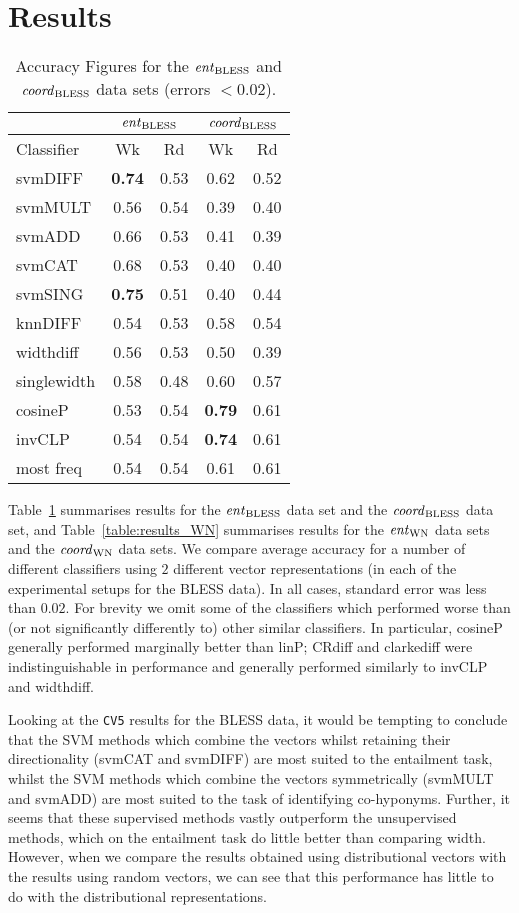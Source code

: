 \documentclass[11pt]{article}
\newcommand\entBLESS{\mbox{\em ent\/}_{\mbox{\scriptsize BLESS}}}
\newcommand\coordBLESS{\mbox{\em coord\/}_{\mbox{\scriptsize BLESS}}}
\newcommand\entWN{\mbox{\em ent\/}_{\mbox{\scriptsize WN}}}
\newcommand\coordWN{\mbox{\em coord\/}_{\mbox{\scriptsize WN}}}
\begin{document}
\section{Results}
\label{sect:results}

\begin{table}[ht]
\centering
\begin{tabular}{|l|c|c||c|c|}
\hline
&\multicolumn{2}{|c||}{$\entBLESS$}&\multicolumn{2}{|c|}{$\coordBLESS$}\\
\hline
Classifier&Wk&Rd&Wk&Rd\\
\hline
svmDIFF&\textbf{0.74}&0.53&0.62&0.52\\
svmMULT&0.56&0.54&0.39&0.40\\
svmADD&0.66&0.53&0.41&0.39\\
svmCAT&0.68&0.53&0.40&0.40\\
svmSING&\textbf{0.75}&0.51&0.40&0.44\\
knnDIFF&0.54&0.53&0.58&0.54\\
\hline
widthdiff&0.56&0.53&0.50&0.39\\
singlewidth&0.58&0.48&0.60&0.57\\
cosineP&0.53&0.54&\textbf{0.79}&0.61\\
invCLP&0.54&0.54&\textbf{0.74}&0.61\\
most freq&0.54&0.54&0.61&0.61\\
\hline
\end{tabular}
\caption{Accuracy Figures for the \emph{$\entBLESS$} and \emph{$\coordBLESS$} data sets (errors $< $0.02).}
\label{table:results_ent}
\end{table}


Table~\ref{table:results_ent} summarises results for the $\entBLESS$ data set and the $\coordBLESS$ data set, and Table~\ref{table:results_WN} summarises results for the $\entWN$ data sets and the $\coordWN$ data sets.  We compare average accuracy for a number of different classifiers using $2$ different vector representations (in each of the experimental setups for the BLESS data).  In all cases, standard error was less than $0.02$.  For brevity we omit some of the classifiers which performed worse than (or not significantly differently to) other similar classifiers.  In particular, cosineP generally performed marginally better than linP; CRdiff and clarkediff were indistinguishable in performance and generally performed similarly to invCLP and widthdiff.

Looking at the \texttt{CV5} results for the BLESS data, it would be tempting to conclude that the SVM methods which combine the vectors whilst retaining their directionality (svmCAT and svmDIFF) are most suited to the entailment task, whilst the SVM methods which combine the vectors symmetrically (svmMULT and svmADD) are most suited to the task of identifying co-hyponyms.  Further, it  seems that these supervised methods vastly outperform the unsupervised methods, which on the entailment task do little better than comparing width.  However, when we compare the results obtained using distributional vectors with the results using random vectors, we can see that this performance has little to do with the distributional representations.  
\end{document}
